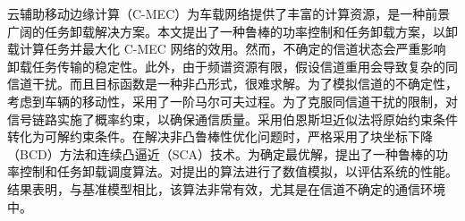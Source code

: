 云辅助移动边缘计算（C-MEC）为车载网络提供了丰富的计算资源，是一种前景广阔的任务卸载解决方案。本文提出了一种鲁棒的功率控制和任务卸载方案，以卸载计算任务并最大化 C-MEC 网络的效用。然而，不确定的信道状态会严重影响卸载任务传输的稳定性。此外，由于频谱资源有限，假设信道重用会导致复杂的同信道干扰。而且目标函数是一种非凸形式，很难求解。为了模拟信道的不确定性，考虑到车辆的移动性，采用了一阶马尔可夫过程。为了克服同信道干扰的限制，对信号链路实施了概率约束，以确保通信质量。采用伯恩斯坦近似法将原始约束条件转化为可解约束条件。在解决非凸鲁棒性优化问题时，严格采用了块坐标下降（BCD）方法和连续凸逼近（SCA）技术。为确定最优解，提出了一种鲁棒的功率控制和任务卸载调度算法。对提出的算法进行了数值模拟，以评估系统的性能。结果表明，与基准模型相比，该算法非常有效，尤其是在信道不确定的通信环境中。

